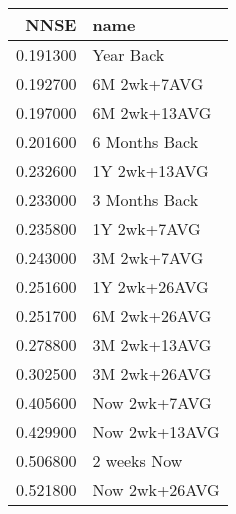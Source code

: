 \begin{tabular}{rl}
NNSE & name \\
\hline
0.191300 & Year Back \\
0.192700 & 6M 2wk+7AVG \\
0.197000 & 6M 2wk+13AVG \\
0.201600 & 6 Months Back \\
0.232600 & 1Y 2wk+13AVG \\
0.233000 & 3 Months Back \\
0.235800 & 1Y 2wk+7AVG \\
0.243000 & 3M 2wk+7AVG \\
0.251600 & 1Y 2wk+26AVG \\
0.251700 & 6M 2wk+26AVG \\
0.278800 & 3M 2wk+13AVG \\
0.302500 & 3M 2wk+26AVG \\
0.405600 & Now 2wk+7AVG \\
0.429900 & Now 2wk+13AVG \\
0.506800 & 2 weeks Now \\
0.521800 & Now 2wk+26AVG \\
\hline
\end{tabular}